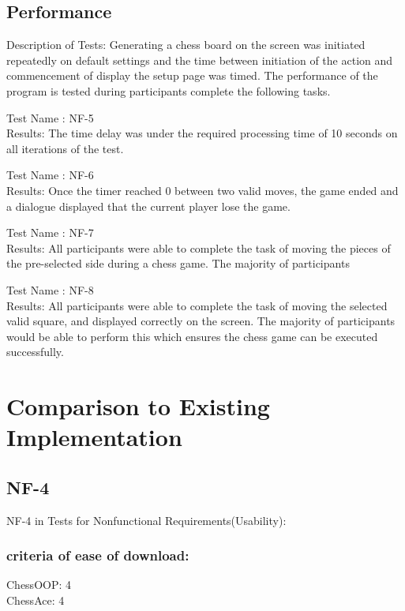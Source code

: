 \documentclass[12pt, titlepage]{article}
\begin{document}
\subsection{Performance}
Description of Tests: Generating a chess board on the screen was initiated repeatedly on default settings and the time between initiation of the action and commencement of display the setup page was timed. The performance of the program is tested during participants complete the following tasks.

\item{Test Name : NF-5\\}
Results: The time delay was under the required processing time of 10 seconds on all iterations of the test.

\item{Test Name : NF-6\\}
Results: Once the timer reached 0 between two valid moves, the game ended and a dialogue displayed that the current player lose the game.

\item{Test Name : NF-7\\}
Results: All participants were able to complete the task of moving the pieces of the pre-selected side during a chess game. The majority of participants

\item{Test Name : NF-8\\}
Results: All participants were able to complete the task of moving the selected valid square, and displayed correctly on the screen. The majority of participants would be able to perform this which ensures the chess game can be executed successfully.\\



\section{Comparison to Existing Implementation}	
\subsection{NF-4}
NF-4 in Tests for Nonfunctional Requirements(Usability):
\subsubsection{criteria of ease of download:}
ChessOOP: 4\\
ChessAce: 4\\
\end{document}
